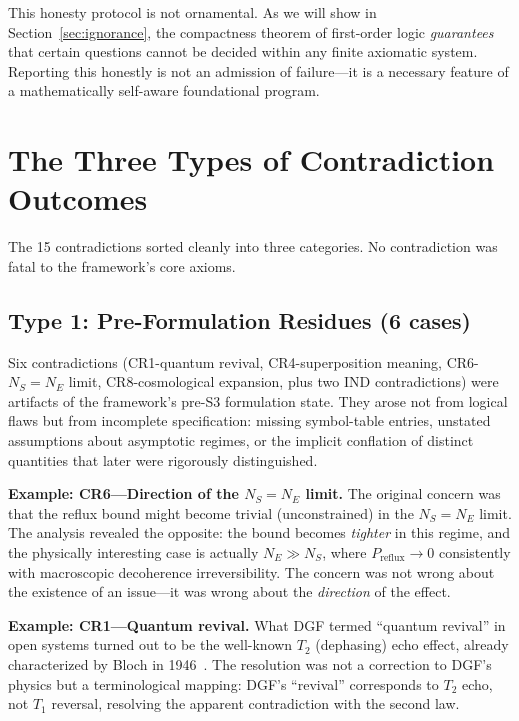\documentclass[12pt,a4paper]{article}
\theoremstyle{definition}
\theoremstyle{remark}
\begin{document}
This honesty protocol is not ornamental. As we will show in Section~\ref{sec:ignorance}, the compactness theorem of first-order logic \emph{guarantees} that certain questions cannot be decided within any finite axiomatic system. Reporting this honestly is not an admission of failure---it is a necessary feature of a mathematically self-aware foundational program.

\section{The Three Types of Contradiction Outcomes}
\label{sec:outcomes}

The 15 contradictions sorted cleanly into three categories. No contradiction was fatal to the framework's core axioms.

\subsection{Type 1: Pre-Formulation Residues (6 cases)}

Six contradictions (CR1-quantum revival, CR4-superposition meaning, CR6-$N_S=N_E$ limit, CR8-cosmological expansion, plus two IND contradictions) were artifacts of the framework's pre-S3 formulation state. They arose not from logical flaws but from incomplete specification: missing symbol-table entries, unstated assumptions about asymptotic regimes, or the implicit conflation of distinct quantities that later were rigorously distinguished.

\textbf{Example: CR6---Direction of the $N_S=N_E$ limit.} The original concern was that the reflux bound might become trivial (unconstrained) in the $N_S=N_E$ limit. The analysis revealed the opposite: the bound becomes \emph{tighter} in this regime, and the physically interesting case is actually $N_E \gg N_S$, where $P_{\mathrm{reflux}} \to 0$ consistently with macroscopic decoherence irreversibility. The concern was not wrong about the existence of an issue---it was wrong about the \emph{direction} of the effect.

\textbf{Example: CR1---Quantum revival.} What DGF termed ``quantum revival'' in open systems turned out to be the well-known $T_2$ (dephasing) echo effect, already characterized by Bloch in 1946~\cite{Bloch1946}. The resolution was not a correction to DGF's physics but a terminological mapping: DGF's ``revival'' corresponds to $T_2$ echo, not $T_1$ reversal, resolving the apparent contradiction with the second law.
\end{document}
